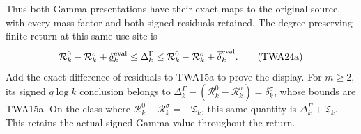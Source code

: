 Thus both Gamma presentations have their exact maps to the original
source, with every mass factor and both signed residuals retained.
The degree-preserving finite return at this same use site is
\[
 \mathcal R_k^0-\mathcal R_k^\sigma+\underline\delta_k^{\rm eval}
 \leq\Delta_k^\Gamma
 \leq\mathcal R_k^0-\mathcal R_k^\sigma+\overline\delta_k^{\rm eval}.
 \tag{TWA24a}
\]
Add the exact difference of residuals to TWA15a to prove the
display. For $m\geq2$, its signed $q\log k$ conclusion belongs
to $\Delta_k^\Gamma-(\mathcal R_k^0-\mathcal R_k^\sigma)
=\delta_k^\sigma$, whose bounds are TWA15a. On the class where
$\mathcal R_k^0-\mathcal R_k^\sigma=-\mathfrak T_k$, this same
quantity is $\Delta_k^\Gamma+\mathfrak T_k$. This retains the
actual signed Gamma value throughout the return.